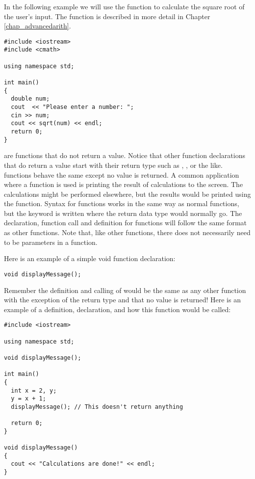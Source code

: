 In the following example we will use the  function to calculate the square root of the user's input. The  function is described in more detail in Chapter \ref{chap_advancedarith}.
 
\begin{lstlisting}
#include <iostream>
#include <cmath>
 
using namespace std;
 
int main()
{
  double num;
  cout  << "Please enter a number: ";
  cin >> num;
  cout << sqrt(num) << endl;
  return 0;
}
\end{lstlisting}
 
 
 are functions that do not return a value. 
Notice that other function declarations that do return a value start with their return type such as , , or the like. 
 functions behave the same except no value is returned. 
A common application where a  function is used is printing the result of calculations to the screen.
The calculations might be performed elsewhere, but the results would be printed using the  function.
Syntax for  functions works in the same way as normal functions, but the keyword  is written where the return data type would normally go. 
The declaration, function call and definition for  functions will follow the same format as other functions. 
Note that, like other functions, there does not necessarily need to be parameters in a  function.

Here is an example of a simple void function declaration:

\begin{lstlisting}
void displayMessage();
\end{lstlisting}

Remember the definition and calling of  would be the same as any other function with the exception of the  return type and that no value is returned! 
Here is an example of a definition, declaration, and how this function would be called:

\begin{lstlisting}
#include <iostream>

using namespace std;

void displayMessage();

int main()
{
  int x = 2, y;
  y = x + 1;
  displayMessage(); // This doesn't return anything
  
  return 0;
}

void displayMessage()
{
  cout << "Calculations are done!" << endl;
}
\end{lstlisting}


